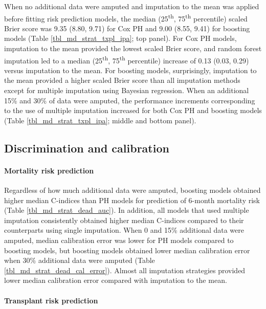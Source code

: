 \documentclass{article}
\begin{document}
When no additional data were amputed and imputation to the mean was
applied before fitting risk prediction models, the median
(25\textsuperscript{th}, 75\textsuperscript{th} percentile) scaled Brier
score was 9.35 (8.80, 9.71) for Cox PH and 9.00 (8.55, 9.41) for
boosting models (Table \ref{tbl_md_strat_txpl_ipa}; top panel). For Cox
PH models, imputation to the mean provided the lowest scaled Brier
score, and random forest imputation led to a median
(25\textsuperscript{th}, 75\textsuperscript{th} percentile) increase of
0.13 (0.03, 0.29) versus imputation to the mean. For boosting models,
surprisingly, imputation to the mean provided a higher scaled Brier
score than all imputation methods except for multiple imputation using
Bayesian regression. When an additional 15\% and 30\% of data were
amputed, the performance increments corresponding to the use of multiple
imputation increased for both Cox PH and boosting models (Table
\ref{tbl_md_strat_txpl_ipa}; middle and bottom panel).

\hypertarget{discrimination-and-calibration}{%
\subsection{Discrimination and
calibration}\label{discrimination-and-calibration}}

\paragraph{Mortality risk prediction}

Regardless of how much additional data were amputed, boosting models
obtained higher median C-indices than PH models for prediction of
6-month mortality risk (Table \ref{tbl_md_strat_dead_auc}). In addition,
all models that used multiple imputation consistently obtained higher
median C-indices compared to their counterparts using single imputation.
When 0 and 15\% additional data were amputed, median calibration error
was lower for PH models compared to boosting models, but boosting models
obtained lower median calibration error when 30\% additional data were
amputed (Table \ref{tbl_md_strat_dead_cal_error}). Almost all imputation
strategies provided lower median calibration error compared with
imputation to the mean.

\paragraph{Transplant risk prediction}
\end{document}
